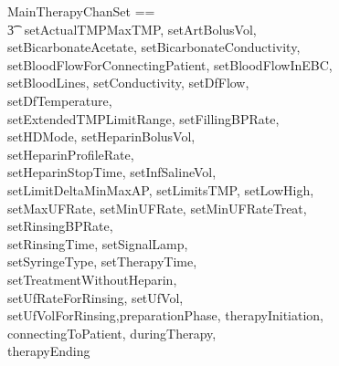 \begin{circus}
  \circchanset MainTherapyChanSet ==
  \\\t3 \lchanset~setActualTMPMaxTMP, setArtBolusVol,\\
    setBicarbonateAcetate, setBicarbonateConductivity,\\
    setBloodFlowForConnectingPatient, setBloodFlowInEBC,\\
    setBloodLines, setConductivity, setDfFlow,\\
    setDfTemperature,\\
    setExtendedTMPLimitRange, setFillingBPRate,\\
    setHDMode, setHeparinBolusVol,\\
     setHeparinProfileRate,\\
    setHeparinStopTime, setInfSalineVol,\\
    setLimitDeltaMinMaxAP, setLimitsTMP, setLowHigh,\\
    setMaxUFRate, setMinUFRate, setMinUFRateTreat,\\
    setRinsingBPRate,\\
    setRinsingTime, setSignalLamp,\\
    setSyringeType, setTherapyTime,\\
    setTreatmentWithoutHeparin,\\
    setUfRateForRinsing, setUfVol,\\
    setUfVolForRinsing,preparationPhase, therapyInitiation,\\
        connectingToPatient, duringTherapy,\\
        therapyEnding~\rchanset
\end{circus}
